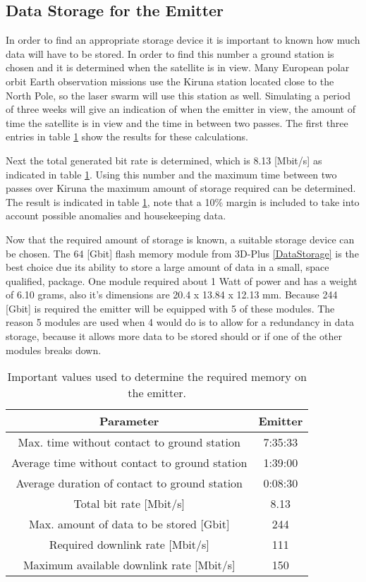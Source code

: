 \subsection{Data Storage for the Emitter}
\label{DSEmitter}

In order to find an appropriate storage device it is important to known how much data will have to be stored. In order to find this number a ground station is chosen and it is determined when the satellite is in view. Many European polar orbit Earth observation missions use the Kiruna station located close to the North Pole, so the laser swarm will use this station as well. Simulating a period of three weeks will give an indication of when the emitter in view, the amount of time the satellite is in view and the time in between two passes. The first three entries in table \ref{DSEmitterTable} show the results for these calculations.

Next the total generated bit rate is determined, which is 8.13 [Mbit/s] as indicated in table \ref{DSEmitterTable}. Using this number and the maximum time between two passes over Kiruna the maximum amount of storage required can be determined. The result is indicated in table \ref{DSEmitterTable}, note that a 10\% margin is included to take into account possible anomalies and housekeeping data. 

Now that the required amount of storage is known, a suitable storage device can be chosen. The 64 [Gbit] flash memory module from 3D-Plus \ref{DataStorage} is the best choice due its ability to store a large amount of data in a small, space qualified, package. One module required about 1 Watt of power and has a weight of 6.10 grams, also it's dimensions are 20.4 x 13.84 x 12.13 mm. Because 244 [Gbit] is required the emitter will be equipped with 5 of these modules. The reason 5 modules are used when 4 would do is to allow for a redundancy in data storage, because it allows more data to be stored should or if one of the other modules breaks down.

\begin{table}
\centering
\begin{tabular}{c|c}
\textbf{Parameter}  & \textbf{Emitter} \\\hline\hline
	Max. time without contact to ground station & 7:35:33 \\
	Average time without contact to ground station & 1:39:00  \\
	Average duration of contact to ground station & 0:08:30 \\
	Total bit rate [Mbit/s] & 8.13 \\
	Max. amount of data to be stored [Gbit] & 244 \\
	Required downlink rate [Mbit/s] & 111 \\
	Maximum available downlink rate [Mbit/s] & 150 \\
\end{tabular}
\caption{Important values used to determine the required memory on the emitter.}
\label{DSEmitterTable}
\end{table}

